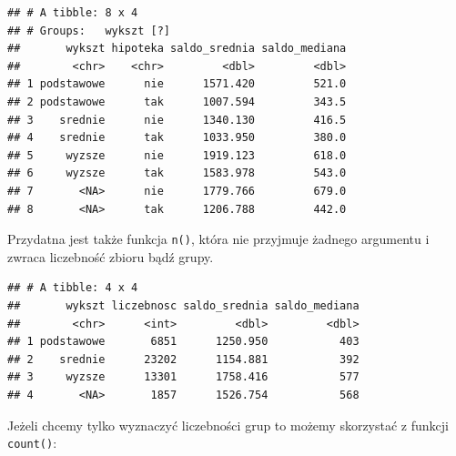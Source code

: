 \documentclass[]{book}
\newenvironment{Shaded}{\begin{snugshade}}{\end{snugshade}}
\newcommand{\KeywordTok}[1]{\textcolor[rgb]{0.13,0.29,0.53}{\textbf{#1}}}
\newcommand{\DataTypeTok}[1]{\textcolor[rgb]{0.13,0.29,0.53}{#1}}
\newcommand{\StringTok}[1]{\textcolor[rgb]{0.31,0.60,0.02}{#1}}
\newcommand{\OperatorTok}[1]{\textcolor[rgb]{0.81,0.36,0.00}{\textbf{#1}}}
\newcommand{\NormalTok}[1]{#1}
\begin{document}
\begin{verbatim}
## # A tibble: 8 x 4
## # Groups:   wykszt [?]
##       wykszt hipoteka saldo_srednia saldo_mediana
##        <chr>    <chr>         <dbl>         <dbl>
## 1 podstawowe      nie      1571.420         521.0
## 2 podstawowe      tak      1007.594         343.5
## 3    srednie      nie      1340.130         416.5
## 4    srednie      tak      1033.950         380.0
## 5     wyzsze      nie      1919.123         618.0
## 6     wyzsze      tak      1583.978         543.0
## 7       <NA>      nie      1779.766         679.0
## 8       <NA>      tak      1206.788         442.0
\end{verbatim}

Przydatna jest także funkcja \texttt{n()}, która nie przyjmuje żadnego
argumentu i zwraca liczebność zbioru bądź grupy.

\begin{Shaded}
\end{Shaded}

\begin{verbatim}
## # A tibble: 4 x 4
##       wykszt liczebnosc saldo_srednia saldo_mediana
##        <chr>      <int>         <dbl>         <dbl>
## 1 podstawowe       6851      1250.950           403
## 2    srednie      23202      1154.881           392
## 3     wyzsze      13301      1758.416           577
## 4       <NA>       1857      1526.754           568
\end{verbatim}

Jeżeli chcemy tylko wyznaczyć liczebności grup to możemy skorzystać z
funkcji \texttt{count()}:

\begin{Shaded}
\end{Shaded}
\end{document}
